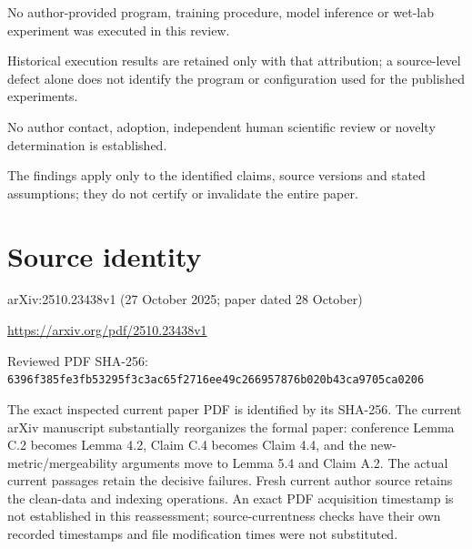 \documentclass[11pt]{article}
\begin{document}
No author-provided program, training procedure, model inference or wet-lab experiment was executed in this review.\par

Historical execution results are retained only with that attribution; a source-level defect alone does not identify the program or configuration used for the published experiments.\par

No author contact, adoption, independent human scientific review or novelty determination is established.\par

The findings apply only to the identified claims, source versions and stated assumptions; they do not certify or invalidate the entire paper.\par

\section*{Source identity}

arXiv:2510.23438v1 (27 October 2025; paper dated 28 October)

\url{https://arxiv.org/pdf/2510.23438v1}

Reviewed PDF SHA-256: \nolinkurl{6396f385fe3fb53295f3c3ac65f2716ee49c266957876b020b43ca9705ca0206}

The exact inspected current paper PDF is identified by its SHA-256. The current arXiv manuscript substantially reorganizes the formal paper: conference Lemma C.2 becomes Lemma 4.2, Claim C.4 becomes Claim 4.4, and the new-metric/mergeability arguments move to Lemma 5.4 and Claim A.2. The actual current passages retain the decisive failures. Fresh current author source retains the clean-data and indexing operations. An exact PDF acquisition timestamp is not established in this reassessment; source-currentness checks have their own recorded timestamps and file modification times were not substituted.
\end{document}

